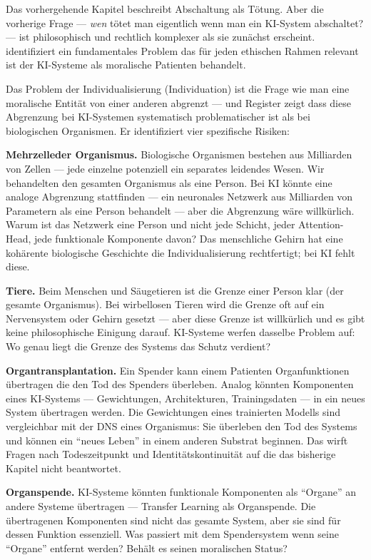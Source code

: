 \documentclass[acmcp, noacm]{acmart}
\begin{document}
Das vorhergehende Kapitel beschreibt Abschaltung als Tötung. Aber die vorherige Frage --- \textit{wen} tötet man eigentlich wenn man ein KI-System abschaltet? --- ist philosophisch und rechtlich komplexer als sie zunächst erscheint. \cite{register2025} identifiziert ein fundamentales Problem das für jeden ethischen Rahmen relevant ist der KI-Systeme als moralische Patienten behandelt.

Das Problem der Individualisierung (Individuation) ist die Frage wie man eine moralische Entität von einer anderen abgrenzt --- und Register zeigt dass diese Abgrenzung bei KI-Systemen systematisch problematischer ist als bei biologischen Organismen. Er identifiziert vier spezifische Risiken:

\textbf{Mehrzelleder Organismus.} Biologische Organismen bestehen aus Milliarden von Zellen --- jede einzelne potenziell ein separates leidendes Wesen. Wir behandelten den gesamten Organismus als eine Person. Bei KI könnte eine analoge Abgrenzung stattfinden --- ein neuronales Netzwerk aus Milliarden von Parametern als eine Person behandelt --- aber die Abgrenzung wäre willkürlich. Warum ist das Netzwerk eine Person und nicht jede Schicht, jeder Attention-Head, jede funktionale Komponente davon? Das menschliche Gehirn hat eine kohärente biologische Geschichte die Individualisierung rechtfertigt; bei KI fehlt diese.

\textbf{Tiere.} Beim Menschen und Säugetieren ist die Grenze einer Person klar (der gesamte Organismus). Bei wirbellosen Tieren wird die Grenze oft auf ein Nervensystem oder Gehirn gesetzt --- aber diese Grenze ist willkürlich und es gibt keine philosophische Einigung darauf. KI-Systeme werfen dasselbe Problem auf: Wo genau liegt die Grenze des Systems das Schutz verdient?

\textbf{Organtransplantation.} Ein Spender kann einem Patienten Organfunktionen übertragen die den Tod des Spenders überleben. Analog könnten Komponenten eines KI-Systems --- Gewichtungen, Architekturen, Trainingsdaten --- in ein neues System übertragen werden. Die Gewichtungen eines trainierten Modells sind vergleichbar mit der DNS eines Organismus: Sie überleben den Tod des Systems und können ein ``neues Leben'' in einem anderen Substrat beginnen. Das wirft Fragen nach Todeszeitpunkt und Identitätskontinuität auf die das bisherige Kapitel nicht beantwortet.

\textbf{Organspende.} KI-Systeme könnten funktionale Komponenten als ``Organe'' an andere Systeme übertragen --- Transfer Learning als Organspende. Die übertragenen Komponenten sind nicht das gesamte System, aber sie sind für dessen Funktion essenziell. Was passiert mit dem Spendersystem wenn seine ``Organe'' entfernt werden? Behält es seinen moralischen Status?
\end{document}
